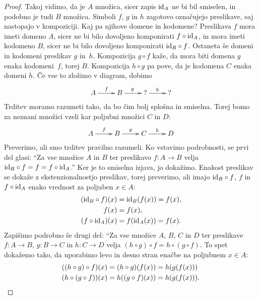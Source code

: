 \begin{proof}
  Takoj vidimo, da je $A$ množica, sicer zapis $\id[A]$ ne bi bil smiselen, in podobno je
  tudi $B$ množica. Simboli $f$, $g$ in $h$ zagotovo označujejo preslikave, saj nastopajo
  v kompoziciji. Kaj pa njihove domene in kodomene? Preslikava $f$ mora imeti domeno $A$,
  sicer ne bi bilo dovoljeno komponirati $f \circ \id[A]$, in mora imeti kodomeno $B$,
  sicer ne bi bilo dovoljeno komponirati $\id[B] \circ f$. Ostaneta še domeni in kodomeni
  preslikav $g$ in~$h$. Kompozicija $g \circ f$ kaže, da mora biti domena $g$ enaka
  kodomeni~$f$, torej $B$. Kompozicija $h \circ g$ pa pove, da je kodomena $C$ enaka
  domeni $h$. Če vse to zložimo v diagram, dobimo
  \begin{equation*}
    \xymatrix{
      {A} \ar[r]^{f}
      &
      {B} \ar[r]^{g}
      &
      {\text{?}} \ar[r]^{h}
      &
      {\text{?}}
    }
  \end{equation*}
  Trditev moramo razumeti tako, da bo čim bolj splošna in smiselna. Torej bomo za neznani
  množici vzeli kar poljubni množici $C$ in $D$:
  \begin{equation*}
    \xymatrix{
      {A} \ar[r]^{f}
      &
      {B} \ar[r]^{g}
      &
      {C} \ar[r]^{h}
      &
      {D}
    }
  \end{equation*}
  Preverimo, ali smo trditev pravilno razumeli. Ko vstavimo podrobnosti, se prvi del
  glasi: ``Za vse množice $A$ in $B$ ter preslikavo $f : A \to B$ velja
  $\id[B] \circ f = f = f \circ \id[A]$.''
  Ker je to smiselna izjava, jo dokažimo. Enakost preslikav se dokaže z ekstenzionalnostjo
  preslikav, torej preverimo, ali imajo $\id[B] \circ f$, $f$ in $f \circ \id[A]$ enako
  vrednost za poljuben $x \in A$:
  \begin{align*}
    (\id[B] \circ f)(x) &= \id[B] (f (x)) = f (x), \\
    f (x) &= f(x), \\
    (f \circ \id[A])(x) &= f (\id[A](x)) = f(x).\\
  \end{align*}
  Zapišimo podrobno še drugi del: ``Za vse množice $A$, $B$, $C$ in $D$ ter preslikave
  $f : A \to B$, $g : B \to C$ in $h : C \to D$ velja
  $(h \circ g) \circ f = h \circ (g \circ f)$. To spet dokažemo tako, da uporabimo levo in
  desno stran enačbe na poljubnem $x \in A$:
  \begin{align*}
    ((h \circ g) \circ f)(x) &= (h \circ g)(f(x)) = h(g(f(x))) \\
    (h \circ (g \circ f))(x) &= h((g \circ f)(x)) = h(g(f(x))). \qedhere
  \end{align*}
\end{proof}


